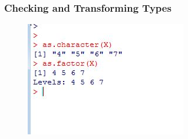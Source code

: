 \documentclass{beamer}
\begin{document}
 		\begin{frame}
 			
 				\frametitle{Checking and Transforming Types}	
 			\begin{figure}
 				\centering
 				\includegraphics[width=1.2\linewidth]{images/typeconversion} 
 			\end{figure}
 		\end{frame}   
 	
\end{document}
